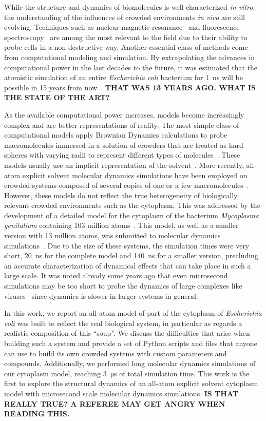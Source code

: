 \documentclass[journal=jcisd8,manuscript=article]{achemso}
\begin{document}
While the structure and dynamics of biomolecules is well characterized
\textit{in vitro}, the understanding of the influences of crowded
environments \textit{in vivo} are still evolving.  Techniques such as
nuclear magnetic resonance~\cite{reckel2007,pielak2008} and
fluorescence spectroscopy~\cite{ignatova2004,xie2008,English2011} are
among the most relevant to the field due to their ability to probe
cells in a non destructive way. Another essential class of methods
come from computational modeling and simulation. By extrapolating the
advances in computational power in the last decades to the future, it
was estimated that the atomistic simulation of an entire
\textit{Escherichia coli} bacterium for \SI{1}{\nano\second} will be
possible in 15 years from now~\cite{vanGunsteren2006a}. {\bf THAT WAS
  13 YEARS AGO. WHAT IS THE STATE OF THE ART?}

As the available computational power increases, models become
increasingly complex and are better representations of reality. The
most simple class of computational models apply Brownian Dynamics
calculations to probe macromolecules immersed in a solution of
crowders that are treated as hard spheres with varying radii to
represent different types of molecules~\cite{Ando2010}. These models
usually use an implicit representation of the
solvent~\cite{Mcguffee2010}. More recently, all-atom explicit solvent
molecular dynamics simulations have been employed on crowded systems
composed of several copies of one or a few
macromolecules~\cite{Wang2017c}. However, these models do not reflect
the true heterogeneity of biologically relevant crowded environments
such as the cytoplasm. This was addressed by the development of a
detailed model for the cytoplasm of the bacterium \textit{Mycoplasma
  genitalium} containing 103 million atoms~\cite{Feig2015}. This
model, as well as a smaller version with 13 million atoms, was
submitted to molecular dynamics simulations~\cite{Yu2016a}. Due to the
size of these systems, the simulation times were very short,
\SI{20}{\nano\second} for the complete model and
\SI{140}{\nano\second} for a smaller version, precluding an accurate
characterization of dynamical effects that can take place in such a
large scale. It was noted already some years ago that even
{microsecond} simulations may be too short to probe the dynamics of
large complexes like viruses~\cite{Larsson2012a} since dynamics is
slower in larger systems in general.

In this work, we report an all-atom model of part of the cytoplasm of
\textit{Escherichia coli} was built to reflect the real biological
system, in particular as regards a realistic composition of this
``soup''. We discuss the difficulties that arise when building such a
system and provide a set of Python scripts and files that anyone can
use to build its own crowded systems with custom parameters and
compounds. Additionally, we performed long molecular dynamics
simulations of our cytoplasm model, reaching \SI{3}{\micro\second} of
total simulation time. This work is the first to explore the
structural dynamics of an all-atom explicit solvent cytoplasm model
with microsecond scale molecular dynamics simulations. {\bf IS THAT
  REALLY TRUE? A REFEREE MAY GET ANGRY WHEN READING THIS.}
\end{document}
